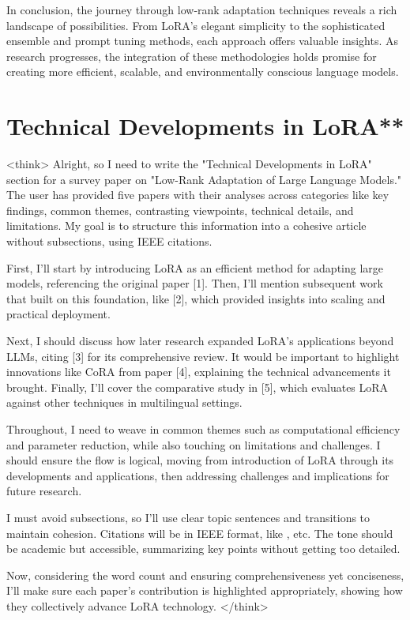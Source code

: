 \documentclass[conference]{IEEEtran}
\begin{document}
In conclusion, the journey through low-rank adaptation techniques reveals a rich landscape of possibilities. From LoRA's elegant simplicity to the sophisticated ensemble and prompt tuning methods, each approach offers valuable insights. As research progresses, the integration of these methodologies holds promise for creating more efficient, scalable, and environmentally conscious language models.

\section{Technical Developments in LoRA**}
<think>
Alright, so I need to write the "Technical Developments in LoRA" section for a survey paper on "Low-Rank Adaptation of Large Language Models." The user has provided five papers with their analyses across categories like key findings, common themes, contrasting viewpoints, technical details, and limitations. My goal is to structure this information into a cohesive article without subsections, using IEEE citations.

First, I'll start by introducing LoRA as an efficient method for adapting large models, referencing the original paper [1]. Then, I'll mention subsequent work that built on this foundation, like [2], which provided insights into scaling and practical deployment. 

Next, I should discuss how later research expanded LoRA's applications beyond LLMs, citing [3] for its comprehensive review. It would be important to highlight innovations like CoRA from paper [4], explaining the technical advancements it brought. Finally, I'll cover the comparative study in [5], which evaluates LoRA against other techniques in multilingual settings.

Throughout, I need to weave in common themes such as computational efficiency and parameter reduction, while also touching on limitations and challenges. I should ensure the flow is logical, moving from introduction of LoRA through its developments and applications, then addressing challenges and implications for future research.

I must avoid subsections, so I'll use clear topic sentences and transitions to maintain cohesion. Citations will be in IEEE format, like \cite{b1}, etc. The tone should be academic but accessible, summarizing key points without getting too detailed.

Now, considering the word count and ensuring comprehensiveness yet conciseness, I'll make sure each paper's contribution is highlighted appropriately, showing how they collectively advance LoRA technology.
</think>
\end{document}
